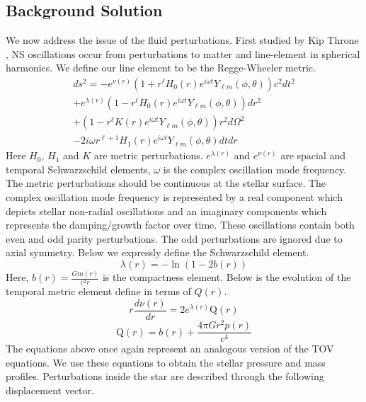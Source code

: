 \documentclass[aps,prd,twocolumn,superscriptaddress,footinbib]{revtex4-1}
\begin{document}
\subsection{Background Solution}
We now address the issue of the fluid perturbations. First studied by Kip Throne \cite{thorne1967non}, NS oscillations occur from perturbations to matter and line-element in spherical harmonics. We define our line element to be the Regge-Wheeler metric. 
\begin{equation}
\begin{array}{r}
d s^{2}=-e^{\nu(r)}\left(1+r^{\ell} H_{0}(r) e^{i \omega t} Y_{\ell m}(\phi, \theta)\right) c^{2} d t^{2} \\
+e^{\lambda(r)}\left(1-r^{\ell} H_{0}(r) e^{i \omega t} Y_{\ell m}(\phi, \theta)\right) d r^{2} \\
+\left(1-r^{\ell} K(r) e^{i \omega t} Y_{\ell m}(\phi, \theta)\right) r^{2} d \Omega^{2} \\
-2 i \omega r^{\ell+1} H_{1}(r) e^{i \omega t} Y_{\ell m}(\phi, \theta) d t d r
\end{array}
\end{equation}
Here $H_0$, $H_1$ and $K$ are metric perturbations. $e^{\lambda(r)}$ and $e^{\nu(r)}$ are spacial and temporal Schwarzschild elements, $\omega$ is the complex oscillation mode frequency. The metric perturbations should be continuous at the stellar surface. The complex oscillation mode frequency is represented by a real component which depicts stellar non-radial oscillations and an imaginary components which represents the damping/growth factor over time. These oscillations contain both even and odd parity perturbations. The odd perturbations are ignored due to axial symmetry. Below we expressly define the Schwarzschild element. 
\begin{equation}
\lambda(r)= -\ln{\left(1-2 b(r)\right)}
\end{equation}
Here, $b(r) = \frac{Gm(r)}{c^2 r}$ is the compactness element. Below is the evolution of the temporal metric element define in terms of $Q(r)$. 
\begin{equation}
r \frac{d \nu(r)}{d r}=2 e^{\lambda(r)} \mathrm{Q}(r)
\end{equation}
\begin{equation}
\mathrm{Q}(r)=b(r)+\frac{4 \pi G r^{2} p(r)}{c^{4}}
\end{equation} 
The equations above once again represent an analogous version of the TOV equations. We use these equations to obtain the stellar pressure and mass profiles. Perturbations inside the star are described through the following displacement vector. 
\end{document}
